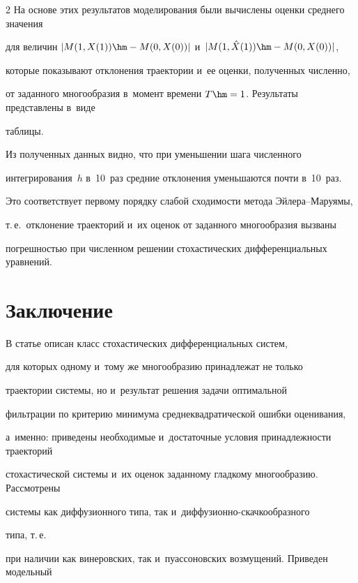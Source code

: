 \begin{multicols}{2}
На основе этих результатов моделирования были вычислены оценки среднего значения 

для величин $|M(1,X(1)) \hm- M(0,X(0))|$ и~$|M(1,\hat X(1)) \hm- M(0,X(0))|$,

 которые показывают отклонения траектории и~ее оценки, полученных численно, 

 от заданного многообразия в~момент времени $T \hm= 1$. Результаты представлены в~виде 

 таб\-лицы.







Из полученных данных видно, что при уменьшении шага численного 

интегрирования~$h$ в~10~раз средние отклонения уменьшаются почти в~10~раз. 

Это соответствует первому порядку слабой сходимости метода Эй\-ле\-ра--Ма\-ру\-ямы, 

т.\,е.\ отклонение траекторий и~их оценок от заданного многообразия вызваны 

погрешностью при численном решении стохастических дифференциальных уравнений.







\section{Заключение}



В статье описан класс стохастических дифференциальных систем, 

для которых одному и~тому же многообразию принадлежат не только 

траектории системы, но и~результат решения задачи оптимальной 

фильтрации по критерию минимума среднеквадратической ошибки оценивания, 

а~именно: приведены необходимые и~достаточные условия принадлежности траекторий 

стохастической системы и~их оценок заданному гладкому многообразию. Рассмотрены 

системы как диффузионного типа, так и~диф\-фу\-зи\-он\-но-скач\-ко\-об\-раз\-но\-го 

типа, т.\,е.\ 

при наличии как винеровских, так и~пуассоновских возмущений. Приведен модельный 


\end{multicols}
